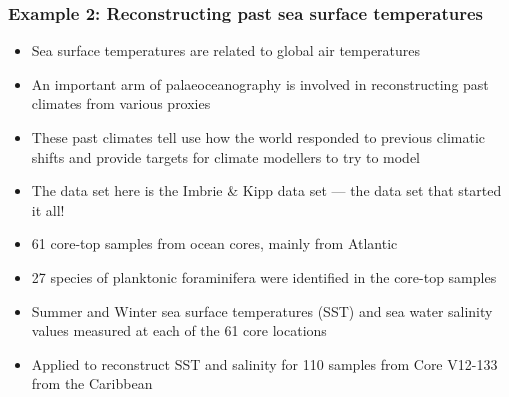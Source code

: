 \documentclass{beamer}
\begin{document}
\begin{frame}
    \frametitle{Example 2: Reconstructing past sea surface temperatures}
    \begin{itemize}
        \item Sea surface temperatures are related to global air temperatures
        \item An important arm of palaeoceanography is involved in reconstructing past climates from various proxies
        \item These past climates tell use how the world responded to previous climatic shifts and provide targets for climate modellers to try to model
        \item The data set here is the Imbrie \& Kipp data set --- the data set that started it all!
        \item 61 core-top samples from ocean cores, mainly from Atlantic
        \item 27 species of planktonic foraminifera were identified in the core-top samples
        \item Summer and Winter sea surface temperatures (SST) and sea water salinity values measured at each of the 61 core locations
        \item Applied to reconstruct SST and salinity for 110 samples from Core V12-133 from the Caribbean
    \end{itemize}
\end{frame}

\end{document}
